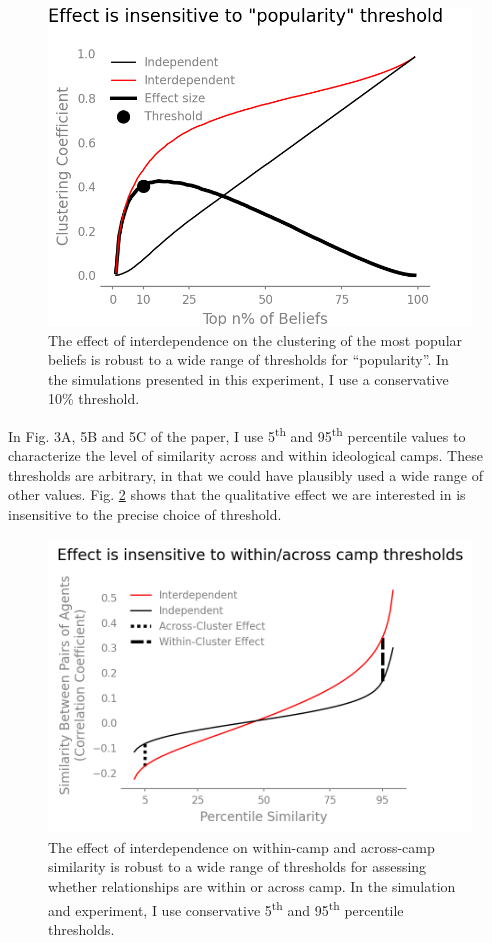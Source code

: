 \documentclass{article}
\begin{document}
\begin{figure}[h!]
\centering
\includegraphics[width=0.5\columnwidth]{insensitive_to_popularity_threshold.png}
\caption{The effect of interdependence on the clustering of the most popular beliefs is robust to a wide range of thresholds for ``popularity''. In the simulations presented in this experiment, I use a conservative 10\% threshold.}
\label{fig:clustering_threshold}
\end{figure}

In Fig. 3A, 5B and 5C of the paper, I use 5\textsuperscript{th} and 95\textsuperscript{th} percentile values to characterize the level of similarity across and within ideological camps. These thresholds are arbitrary, in that we could have plausibly used a wide range of other values. Fig. \ref{fig:camp_threshold} shows that the qualitative effect we are interested in is insensitive to the precise choice of threshold.

\begin{figure}[h!]
\centering
\includegraphics[width=0.6\columnwidth]{insensitive_to_camp_thresholds.png}
\caption{The effect of interdependence on within-camp and across-camp similarity is robust to a wide range of thresholds for assessing whether relationships are within or across camp. In the simulation and experiment, I use conservative 5\textsuperscript{th} and 95\textsuperscript{th} percentile thresholds.}
\label{fig:camp_threshold}
\end{figure}
\end{document}
